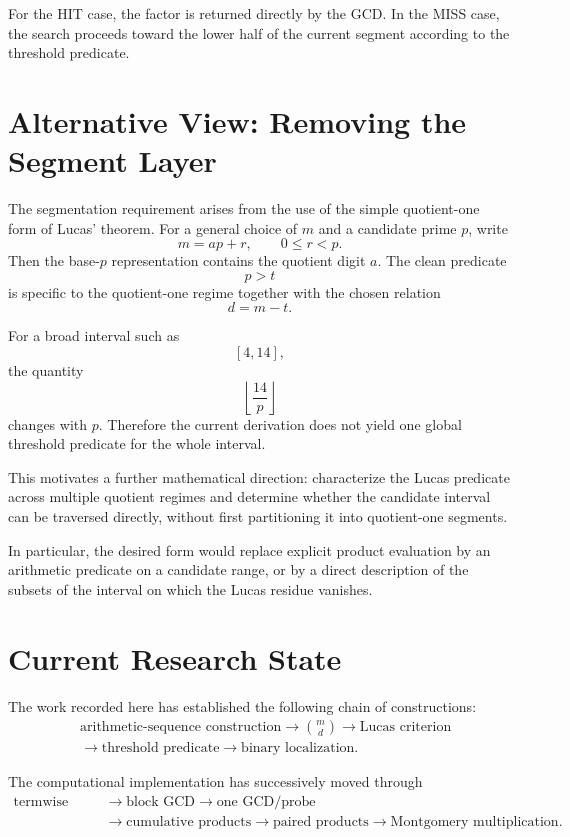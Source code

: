 \documentclass[11pt,a4paper]{article}
\begin{document}
For the HIT case, the factor is returned directly by the GCD. In the MISS case, the search proceeds toward the lower half of the current segment according to the threshold predicate.

\section{Alternative View: Removing the Segment Layer}

The segmentation requirement arises from the use of the simple quotient-one form of Lucas' theorem. For a general choice of $m$ and a candidate prime $p$, write
\[
m=ap+r,
\qquad
0\le r<p.
\]
Then the base-$p$ representation contains the quotient digit $a$. The clean predicate
\[
p>t
\]
is specific to the quotient-one regime together with the chosen relation
\[
d=m-t.
\]

For a broad interval such as
\[
[4,14],
\]
the quantity
\[
\left\lfloor\frac{14}{p}\right\rfloor
\]
changes with $p$. Therefore the current derivation does not yield one global threshold predicate for the whole interval.

This motivates a further mathematical direction: characterize the Lucas predicate across multiple quotient regimes and determine whether the candidate interval can be traversed directly, without first partitioning it into quotient-one segments.

In particular, the desired form would replace explicit product evaluation by an arithmetic predicate on a candidate range, or by a direct description of the subsets of the interval on which the Lucas residue vanishes.

\section{Current Research State}

The work recorded here has established the following chain of constructions:
\[
\begin{aligned}
&\text{arithmetic-sequence construction}
\longrightarrow
\binom{m}{d}
\longrightarrow
\text{Lucas criterion}
\\
&\longrightarrow
\text{threshold predicate}
\longrightarrow
\text{binary localization}.
\end{aligned}
\]

The computational implementation has successively moved through
\[
\begin{aligned}
\text{termwise GCD}
&\longrightarrow \text{block GCD}
\longrightarrow \text{one GCD/probe}
\\
&\longrightarrow \text{cumulative products}
\longrightarrow \text{paired products}
\longrightarrow \text{Montgomery multiplication}.
\end{aligned}
\]
\end{document}
